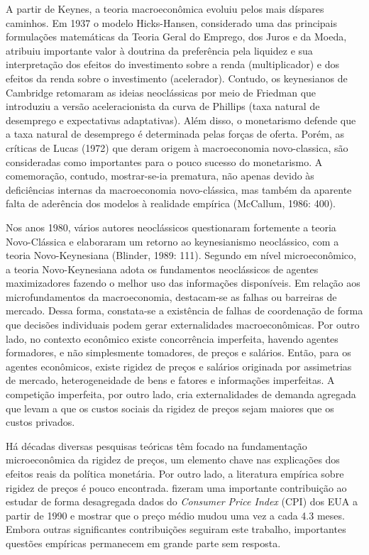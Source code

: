 \documentclass[twoside,a4paper,11pt]{report}
\begin{document}
A partir de Keynes, a teoria macroeconômica evoluiu pelos mais díspares caminhos. Em 1937 o modelo Hicks-Hansen, considerado uma das principais formulações matemáticas da Teoria Geral do Emprego, dos Juros e da Moeda, atribuiu importante valor à doutrina da preferência pela liquidez e sua interpretação dos efeitos do investimento sobre a renda (multiplicador) e dos efeitos da renda sobre o investimento (acelerador). Contudo, os keynesianos de Cambridge retomaram as ideias neoclássicas por meio de Friedman que introduziu a versão aceleracionista da curva de Phillips (taxa natural de desemprego e expectativas adaptativas). Além disso, o monetarismo defende que a taxa natural de desemprego é determinada pelas forças de oferta. Porém, as críticas de Lucas (1972) que deram origem à macroeconomia novo-classica, são consideradas como importantes para o pouco sucesso do monetarismo.  A comemoração, contudo, mostrar-se-ia prematura, não apenas devido às deficiências internas da macroeconomia novo-clássica, mas também da aparente falta de aderência dos modelos à realidade empírica (McCallum, 1986: 400).

Nos anos 1980, vários autores neoclássicos  questionaram fortemente a teoria Novo-Clássica e elaboraram um retorno ao keynesianismo neoclássico, com a teoria Novo-Keynesiana (Blinder, 1989: 111). Segundo \citet{datheinintroduccao} em nível microeconômico, a teoria Novo-Keynesiana adota os fundamentos neoclássicos de agentes maximizadores fazendo o melhor uso das informações disponíveis. Em relação aos microfundamentos da macroeconomia, destacam-se as falhas ou barreiras de mercado. Dessa forma, constata-se a existência de falhas de coordenação de forma que decisões individuais podem gerar externalidades macroeconômicas. Por outro lado, no contexto econômico existe concorrência imperfeita, havendo agentes formadores, e não simplesmente tomadores, de preços e salários. Então, para os agentes econômicos, existe rigidez de preços e salários originada por assimetrias de mercado, heterogeneidade de bens e fatores e informações imperfeitas. A competição imperfeita, por outro lado, cria externalidades de demanda agregada que levam a que os custos sociais da rigidez de preços sejam maiores que os custos privados. 

Há décadas diversas pesquisas teóricas têm focado na fundamentação microeconômica da rigidez de preços, um elemento chave nas explicações dos efeitos reais da política monetária. Por outro lado, a literatura empírica sobre rigidez de preços é pouco encontrada. \citet{bils2004some} fizeram uma importante contribuição ao estudar de forma desagregada dados do \emph{Consumer Price Index} (CPI) dos EUA a partir de 1990 e mostrar que o preço médio mudou uma vez a cada 4.3 meses. Embora outras significantes contribuições seguiram este trabalho, importantes questões empíricas permanecem em grande parte sem resposta.
\end{document}
